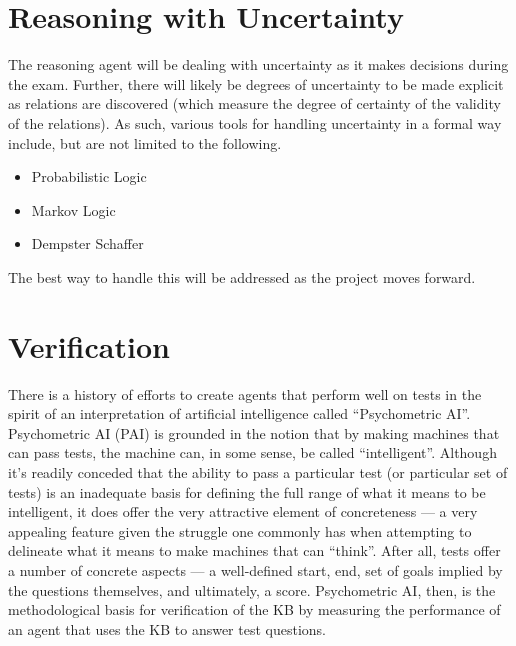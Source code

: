 \section{Reasoning with Uncertainty}

The reasoning agent will be dealing with uncertainty as it makes decisions during the exam.  Further,
there will likely be degrees of uncertainty to be made explicit as relations are discovered (which measure
the degree of certainty of the validity of the relations).  As such, various tools for handling uncertainty
in a formal way include, but are not limited to the following.

\begin{itemize}
\item Probabilistic Logic \cite{nilsson1986probabilistic}

\item Markov Logic \cite{richardson2006markov}

\item Dempster Schaffer \cite{yager1987dempster}

\end{itemize}

The best way to handle this will be addressed as the project moves forward.


\section{Verification}

There is a history of efforts to create agents that perform well on tests in the spirit of an interpretation of artificial intelligence called ``Psychometric AI''\cite{psychoai.ijcai03, bringsjord_jetai_pai_overview_2011, Bringsjord2012}.  Psychometric AI (PAI) is grounded in the notion that by making machines that can pass tests, the machine can, in some sense, be called ``intelligent''\cite{psychoai.ijcai03}.  Although it's readily conceded that the ability to pass a particular test (or particular set of tests) is an inadequate basis for defining the full range of what it means to be intelligent, it does offer the very attractive element of concreteness\cite{psychoai.ijcai03, bringsjord_jetai_pai_overview_2011} --- a very appealing feature given the struggle one commonly has when attempting to delineate what it means to make machines that can ``think''.  After all, tests offer a number of concrete aspects --- a well-defined start, end, set of goals implied by the questions themselves, and ultimately, a score.  Psychometric AI, then, is the methodological basis for verification of the KB by measuring the performance of an agent
that uses the KB to answer test questions.

